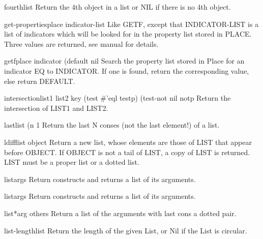 \begin{accessor}{fourth}{list}{}
  Return the 4th object in a list or NIL if there is no 4th object.
\end{accessor}

\begin{function}{get-properties}{place indicator-list}{}
  Like GETF, except that INDICATOR-LIST is a list of indicators which will
  be looked for in the property list stored in PLACE. Three values are
  returned, see manual for details.
\end{function}

\begin{accessor}{getf}{place indicator \op (default nil}{}
  Search the property list stored in Place for an indicator EQ to INDICATOR.
  If one is found, return the corresponding value, else return DEFAULT.
\end{accessor}

\begin{function}{intersection}{list1 list2 \key key (test #'eql testp) (test-not nil notp}{}
  Return the intersection of LIST1 and LIST2.
\end{function}

\begin{function}{last}{list \op (n 1}{}
  Return the last N conses (not the last element!) of a list.
\end{function}

\begin{function}{ldiff}{list object}{}
  Return a new list, whose elements are those of LIST that appear before
   OBJECT. If OBJECT is not a tail of LIST, a copy of LIST is returned.
   LIST must be a proper list or a dotted list.
\end{function}

\begin{function}{list}{\rest args}{}
  Return constructs and returns a list of its arguments.
\end{function}

\begin{class}{list}{\rest args}{}
  Return constructs and returns a list of its arguments.
\end{class}

\begin{function}{list*}{arg \rest others}{}
  Return a list of the arguments with last cons a dotted pair.
\end{function}

\begin{function}{list-length}{list}{}
  Return the length of the given List, or Nil if the List is circular.
\end{function}

